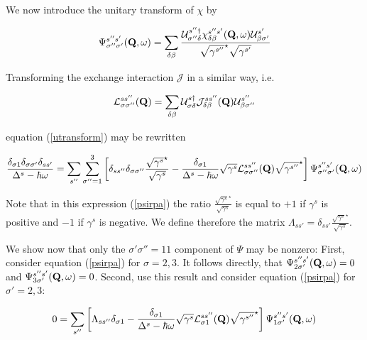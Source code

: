 We now introduce the unitary transform of $\chi$ by

\begin{equation}\label{psidef}
\Psi^{s''s'}_{\sigma''\sigma'}(\mathbf Q,\omega) = \sum_{\delta \beta} 
\frac{
\mathcal U^{s''\dag}_{\sigma''\delta}
\chi_{\delta\beta}^{s''s'}({\mathbf Q},\omega) \mathcal U^{s'}_{\beta\sigma'}
}{\sqrt{\gamma^{s''}}^\star\sqrt{\gamma^{s'}}}
\end{equation}

Transforming the exchange interaction $\mathcal J$ in a similar way, i.e.

\begin{equation}\label{jqtransform}
\mathcal L^{ss''}_{\sigma\sigma''}(\mathbf Q) = \sum_{\delta \beta} 
\mathcal U^{s\dag}_{\sigma\delta}
\mathcal J_{\delta\beta}^{ss''}({\mathbf Q}) \mathcal U^{s''}_{\beta\sigma''}
\end{equation}

equation (\ref{utransform}) may be rewritten

\begin{equation}\label{psirpa}
\frac{\delta_{\sigma1} \delta_{\sigma\sigma'} \delta_{ss'}}{\Delta^s-\hbar\omega}
=
\sum_{s''}\sum_{\sigma''=1}^3
\left[\delta_{ss''}\delta_{\sigma\sigma''}\frac{\sqrt{\gamma^s}^\star}{\sqrt{\gamma^s}}- 
\frac{\delta_{\sigma1}}{\Delta^s-\hbar\omega}\sqrt{\gamma^s}\mathcal L^{ss''}_{\sigma\sigma''}(\mbf Q) %
\sqrt{\gamma^{s''}}^\star\right] 
\Psi_{\sigma''\sigma'}^{s''s'}({\mbf Q},\omega)
\end{equation}

Note that in this expression (\ref{psirpa}) the ratio
$\frac{\sqrt{\gamma^s}^\star}{\sqrt{\gamma^s}}$
is equal to $+1$ if $\gamma^s$ is positive and $-1$ if $\gamma^s$ is negative. We define
therefore the matrix $\Lambda_{ss'}=\delta_{ss'}\frac{\sqrt{\gamma^s}^\star}{\sqrt{\gamma^s}}$.
 
We show now that only the $\sigma'\sigma''=11$ component of $\Psi$ may be nonzero:
First, consider equation (\ref{psirpa}) for $\sigma=2,3$. It follows directly, that 
$\Psi_{2\sigma'}^{s''s'}({\mathbf Q},\omega)=0$ and 
$\Psi_{3\sigma'}^{s''s'}({\mathbf Q},\omega)=0$. Second, use this result and  consider
equation (\ref{psirpa}) for $\sigma'=2,3$:

\begin{equation}
0=
\sum_{s''}
\left[\Lambda_{ss''}\delta_{\sigma1}- 
\frac{\delta_{\sigma1}}{\Delta^s-\hbar\omega}\sqrt{\gamma^s}\mathcal L^{ss''}_{\sigma1}(\mbf Q) %
\sqrt{\gamma^{s''}}^\star\right] 
\Psi_{1\sigma'}^{s''s'}({\mbf Q},\omega)
\end{equation}

